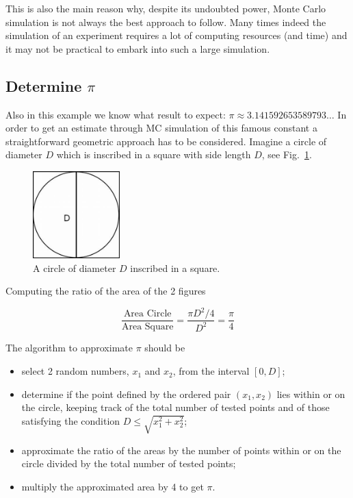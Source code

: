 This is also the main reason why, despite its undoubted power, Monte Carlo simulation is not always the best approach to follow.
Many times indeed the simulation of an experiment requires a lot of computing resources (and time) and it may not be practical to embark into such a large simulation.

\subsection{Determine \(\pi\)}\label{determine-pi}

Also in this example we know what result to expect:
\(\pi\approx 3.141592653589793\ldots\) In order to get an estimate through MC
simulation of this famous constant a straightforward geometric approach has to be considered. Imagine a circle of diameter \(D\) which is inscribed in a square with side length \(D\), see Fig.~\ref{fig:circle_inscribed}.

\begin{figure}[htb]
	\centering
	\includegraphics[width=0.3\textwidth]{figures/circle_inscribed.jpeg}
	\caption{A circle of diameter $D$ inscribed in a square.}
	\label{fig:circle_inscribed}
\end{figure}

Computing the ratio of the area of the 2 figures

\begin{equation}
\frac{\textrm{Area Circle}}{\textrm{Area Square}} = \frac{\pi D^2/4}{D^2} = \frac{\pi}{4} 
\end{equation}

The algorithm to approximate \(\pi\) should be

\begin{itemize}
\item select 2 random numbers, \(x_1\) and \(x_2\), from the interval
\([0,D]\); 
\item determine if the point defined by the ordered pair
\((x_1, x_2)\) lies within or on the circle, keeping track of the total number of
tested points and of those satisfying the condition \(D \le\sqrt{x_1^2 + x_2^2}\); 
\item approximate the ratio of the areas by the number of points within or on
the circle divided by the total number of tested points; 
\item multiply the approximated area by 4 to get \(\pi\).
\end{itemize}

